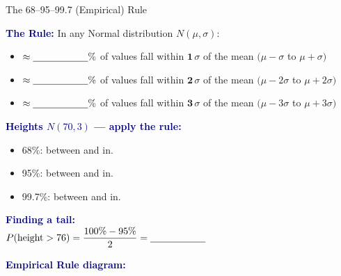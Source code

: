 \documentclass[10pt]{article}
\begin{document}
\vspace{0.08in}

\begin{notesbox}{The 68--95--99.7 (Empirical) Rule}
\small
\begin{multicols}{2}

\textbf{\textcolor{navy}{The Rule:}} In any Normal distribution $N(\mu, \sigma)$:
\begin{itemize}[itemsep=4pt]
  \item $\approx \blank{2cm}\%$ of values fall
        within $\mathbf{1}\,\sigma$ of the mean
        \hfill $(\mu - \sigma$ to $\mu + \sigma)$
  \item $\approx \blank{2cm}\%$ of values fall
        within $\mathbf{2}\,\sigma$ of the mean
        \hfill $(\mu - 2\sigma$ to $\mu + 2\sigma)$
  \item $\approx \blank{2cm}\%$ of values fall
        within $\mathbf{3}\,\sigma$ of the mean
        \hfill $(\mu - 3\sigma$ to $\mu + 3\sigma)$
\end{itemize}

\vspace{6pt}
\textbf{\textcolor{navy}{Heights $N(70,3)$ — apply the rule:}}
\begin{itemize}[itemsep=3pt]
  \item 68\%: between \blank{1.5cm} and \blank{1.5cm} in.
  \item 95\%: between \blank{1.5cm} and \blank{1.5cm} in.
  \item 99.7\%: between \blank{1.5cm} and \blank{1.5cm} in.
\end{itemize}

\vspace{6pt}
\textbf{\textcolor{navy}{Finding a tail:}}\\
$P(\text{height} > 76) = \dfrac{100\% - 95\%}{2} = \blank{2cm}$

\columnbreak

\textbf{\textcolor{navy}{Empirical Rule diagram:}}


\end{multicols}
\end{notesbox}
\end{document}
